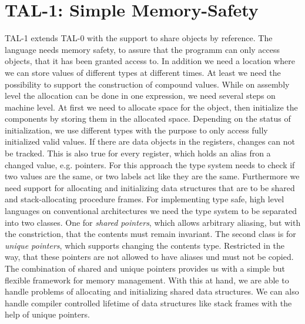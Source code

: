 \documentclass[acmlarge]{acmart}
\begin{document}
	\section{TAL-1: Simple Memory-Safety}
	TAL-1 extends TAL-0 with the support to share objects by reference. The language needs memory safety, to assure that the programm can only access objects, that it has been granted access to. In addition we need a location where we can store values of different types at different times. At least we need the possibility to support the construction of compound values. While on assembly level the allocation can be done in one expression, we need several steps on machine level.
	At first we need to allocate space for the object, then initialize the components by storing them in the allocated space. Depending on the status of initialization, we use different types with the purpose to only access fully initialized valid values.
	If there are data objects in the registers, changes can not be tracked. This is also true for every register, which holds an alias fron a changed value, e.g. pointers.
	For this approach the type system needs to check if two values are the same, or two labels act like they are the same. Furthermore we need support for allocating and initializing data structures that are to be shared and stack-allocating procedure frames.
	For implementing type safe, high level languages on conventional architectures we need the type system to be separated into two classes. One for \emph{shared pointers}, which allows arbitrary aliasing, but with the constriction, that the contents must remain invariant.
	The second class is for \emph{unique pointers}, which supports changing the contents type. Restricted in the way, that these pointers are not allowed to have aliases und must not be copied. 
	The combination of shared and unique pointers provides us with a simple but flexible framework for memory management.
	With this at hand, we are able to handle problems of allocating and initializing shared data structures. We can also handle compiler controlled lifetime of data structures like stack frames with the help of unique pointers.
	
	
\end{document}
